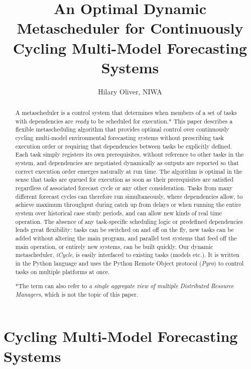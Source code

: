 \documentclass[11pt,a4paper]{article}
\title{An Optimal Dynamic Metascheduler for Continuously Cycling
Multi-Model Forecasting Systems}
\author{Hilary Oliver, NIWA}
\begin{document}
\maketitle

\begin{abstract} A metascheduler is a control system that determines
    when members of a set of tasks with dependencies are {\em ready} to
    be scheduled for execution.* This paper describes a flexible
    metascheduling algorithm that provides optimal control over
    continuously cycling multi-model environmental forecasting systems
    without prescribing task execution order or requiring that
    dependencies between tasks be explicitly defined. Each task simply
    registers its own prerequisites, without reference to other tasks in
    the system, and dependencies are negotiated dynamically as outputs
    are reported so that correct execution order emerges naturally at
    run time.  The algorithm is optimal in the sense that tasks are
    queued for execution as soon as their prerequisites are satisfied
    regardless of associated forecast cycle or any other consideration.
    Tasks from many different forecast cycles can therefore run
    simultaneously, where dependencies allow, to achieve maximum
    throughput during catch up from delays or when running the entire
    system over historical case study periods, and can allow new kinds
    of real time operation. The absence of any task-specific scheduling
    logic or predefined dependencies lends great flexibility: tasks can
    be switched on and off on the fly, new tasks can be added without
    altering the main program, and parallel test systems that feed off
    the main operation, or entirely new systems, can be built quickly.
    Our dynamic metascheduler, {\em iCycle}, is easily interfaced to
    existing tasks (models etc.). It is written in the Python language
    and uses the Python Remote Object protocol ({\em Pyro}) to control
    tasks on multiple platforms at once. 

*The term can also refer to {\it a single aggregate view of multiple
Distributed Resource Managers}, which is not the topic of this paper.

\end{abstract}

\pagebreak
\tableofcontents
\pagebreak

\section{Cycling Multi-Model Forecasting Systems}
\end{document}
